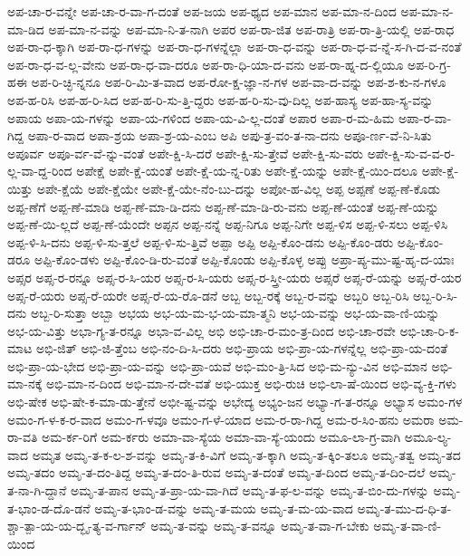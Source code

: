 {ಅಪ-ಚಾ-ರ-ವನ್ನೇ
ಅಪ-ಚಾ-ರ-ವಾ-ಗ-ದಂತೆ
ಅಪ-ಜಯ
ಅಪ-ಥ್ಯದ
ಅಪ-ಮಾನ
ಅಪ-ಮಾ-ನ-ದಿಂದ
ಅಪ-ಮಾ-ನ-ಮಾ-ಡಿದ
ಅಪ-ಮಾ-ನ-ವನ್ನು
ಅಪ-ಮಾ-ನಿ-ತ-ನಾಗಿ
ಅಪರ
ಅಪ-ರಾ-ಜಿತ
ಅಪ-ರಾತ್ರಿ
ಅಪ-ರಾ-ತ್ರಿ-ಯಲ್ಲಿ
ಅಪ-ರಾಧ
ಅಪ-ರಾ-ಧ-ಕ್ಕಾಗಿ
ಅಪ-ರಾ-ಧ-ಗಳನ್ನು
ಅಪ-ರಾ-ಧ-ಗಳನ್ನೆಲ್ಲಾ
ಅಪ-ರಾ-ಧ-ವನ್ನು
ಅಪ-ರಾ-ಧ-ವ-ನ್ನೆ-ಸ-ಗಿ-ದ-ವ-ನಂತೆ
ಅಪ-ರಾ-ಧ-ವ-ಲ್ಲ-ವೇನು
ಅಪ-ರಾ-ಧ-ವಾ-ದರೂ
ಅಪ-ರಾ-ಧಿ-ಯಾ-ದ-ವನು
ಅಪ-ರಾ-ಹ್ನ-ದ-ಲ್ಲಿಯೂ
ಅಪ-ರಿ-ಗ್ರ-ಹಈ
ಅಪ-ರಿ-ಚ್ಛಿ-ನ್ನನೂ
ಅಪ-ರಿ-ಮಿ-ತ-ವಾದ
ಅಪ-ರೋ-ಕ್ಷ-ಜ್ಞಾ-ನ-ಗಳ
ಅಪ-ವಾ-ದ-ವನ್ನು
ಅಪ-ಶ-ಕು-ನ-ಗಳೂ
ಅಪ-ಹ-ರಿಸಿ
ಅಪ-ಹ-ರಿ-ಸಿದ
ಅಪ-ಹ-ರಿ-ಸು-ತ್ತಿ-ದ್ದರು
ಅಪ-ಹ-ರಿ-ಸು-ವು-ದಿಲ್ಲ
ಅಪ-ಹಾಸ್ಯ
ಅಪ-ಹಾ-ಸ್ಯ-ವನ್ನು
ಅಪಾಯ
ಅಪಾ-ಯ-ಗಳನ್ನು
ಅಪಾ-ಯ-ಗಳಿಂದ
ಅಪಾ-ಯ-ವಿ-ಲ್ಲ-ದಂತೆ
ಅಪಾರ
ಅಪಾ-ರ-ಮ-ಹಿಮ
ಅಪಾ-ರ-ವಾ-ಗಿದ್ದ
ಅಪಾ-ರ-ವಾದ
ಅಪಾ-ಶ್ರಯ
ಅಪಾ-ಶ್ರ-ಯ-ಎಂಬ
ಅಪಿ
ಅಪು-ತ್ರ-ವಂ-ತ-ನಾ-ದನು
ಅಪೂ-ರ್ಣ-ವೆ-ನಿ-ಸಿತು
ಅಪೂರ್ವ
ಅಪೂ-ರ್ವ-ವೆ-ನ್ನು-ವಂತೆ
ಅಪೇ-ಕ್ಷಿ-ಸಿ-ದರೆ
ಅಪೇ-ಕ್ಷಿ-ಸು-ತ್ತೇವೆ
ಅಪೇ-ಕ್ಷಿ-ಸು-ವರು
ಅಪೇ-ಕ್ಷಿ-ಸು-ವ-ವ-ರ-ಲ್ಲ-ವಾ-ದ್ದ-ರಿಂದ
ಅಪೇಕ್ಷೆ
ಅಪೇ-ಕ್ಷೆ-ಯಂತೆ
ಅಪೇ-ಕ್ಷೆ-ಯ-ನ್ನ-ರಿತು
ಅಪೇ-ಕ್ಷೆ-ಯನ್ನು
ಅಪೇ-ಕ್ಷೆ-ಯಿಂ-ದಲೂ
ಅಪೇ-ಕ್ಷೆ-ಯಿತ್ತು
ಅಪೇ-ಕ್ಷೆಯೆ
ಅಪೇ-ಕ್ಷೆಯೇ
ಅಪೇ-ಕ್ಷೆ-ಯೇ-ನೆಂ-ಬು-ದನ್ನು
ಅಪೋ-ಹ-ವಿಲ್ಲ
ಅಪ್ಪ
ಅಪ್ಪಣೆ
ಅಪ್ಪ-ಣೆ-ಕೊಡು
ಅಪ್ಪ-ಣೆಗೆ
ಅಪ್ಪ-ಣೆ-ಮಾಡಿ
ಅಪ್ಪ-ಣೆ-ಮಾ-ಡಿ-ದನು
ಅಪ್ಪ-ಣೆ-ಮಾ-ಡಿ-ರು-ವನು
ಅಪ್ಪ-ಣೆ-ಯಂತೆ
ಅಪ್ಪ-ಣೆ-ಯನ್ನು
ಅಪ್ಪ-ಣೆ-ಯಿ-ಲ್ಲದೆ
ಅಪ್ಪ-ಣೆ-ಯೆಂದೇ
ಅಪ್ಪನ
ಅಪ್ಪ-ನನ್ನೆ
ಅಪ್ಪ-ನಿಗೂ
ಅಪ್ಪ-ನಿಗೇ
ಅಪ್ಪ-ಳಿಸ
ಅಪ್ಪ-ಳಿ-ಸಲು
ಅಪ್ಪ-ಳಿಸಿ
ಅಪ್ಪ-ಳಿ-ಸಿ-ದನು
ಅಪ್ಪ-ಳಿ-ಸು-ತ್ತಲೆ
ಅಪ್ಪ-ಳಿ-ಸು-ತ್ತಿವೆ
ಅಪ್ಪಾ
ಅಪ್ಪಿ
ಅಪ್ಪಿ-ಕೊಂ-ಡನು
ಅಪ್ಪಿ-ಕೊಂ-ಡರು
ಅಪ್ಪಿ-ಕೊಂ-ಡರೂ
ಅಪ್ಪಿ-ಕೊಂ-ಡಳು
ಅಪ್ಪಿ-ಕೊಂ-ಡಿ-ರು-ವಂತೆ
ಅಪ್ಪಿ-ಕೊಂಡು
ಅಪ್ಪಿ-ಕೊಳ್ಳ
ಅಪ್ಪು
ಅಪ್ರಾ-ಪ್ಯ-ಮು-ಷ್ಟ-ಹೃ-ದ-ಯಾಃ
ಅಪ್ಸರ
ಅಪ್ಸ-ರ-ರನ್ನೂ
ಅಪ್ಸ-ರ-ಸಿ-ಯರ
ಅಪ್ಸ-ರ-ಸಿ-ಯರು
ಅಪ್ಸ-ರ-ಸ್ತ್ರೀ-ಯರು
ಅಪ್ಸರೆ
ಅಪ್ಸ-ರೆ-ಯನ್ನು
ಅಪ್ಸ-ರೆ-ಯರ
ಅಪ್ಸ-ರೆ-ಯರು
ಅಪ್ಸ-ರೆ-ಯರೇ
ಅಪ್ಸ-ರೆ-ಯ-ರೊ-ಡನೆ
ಅಬ್ಬ
ಅಬ್ಬ-ರಕ್ಕೆ
ಅಬ್ಬ-ರ-ವನ್ನು
ಅಬ್ಬರಿ
ಅಬ್ಬ-ರಿಸಿ
ಅಬ್ಬ-ರಿ-ಸಿ-ದನು
ಅಬ್ಬ-ರಿ-ಸುತ್ತಾ
ಅಬ್ಬಾ
ಅಭಯ
ಅಭ-ಯ-ಮ-ಭ-ಯ-ಮಾ-ತ್ಮನಿ
ಅಭ-ಯ-ವನ್ನು
ಅಭ-ಯ-ವಾ-ಣಿ-ಯನ್ನು
ಅಭ-ಯ-ವಿತ್ತು
ಅಭಾ-ಗ್ಯ-ತ-ರನ್ನೂ
ಅಭಾ-ವ-ವಿಲ್ಲ
ಅಭಿ
ಅಭಿ-ಚಾ-ರ-ಮಂ-ತ್ರ-ದಿಂದ
ಅಭಿ-ಚಾ-ರವೇ
ಅಭಿ-ಚಾ-ರಿ-ಕ-ಮಾಟ
ಅಭಿ-ಜಿತ್
ಅಭಿ-ಜಿ-ತ್ತೆಂಬ
ಅಭಿ-ನಂ-ದಿ-ಸಿ-ದರು
ಅಭಿ-ಪ್ರಾಯ
ಅಭಿ-ಪ್ರಾ-ಯ-ಗಳನ್ನೆಲ್ಲ
ಅಭಿ-ಪ್ರಾ-ಯ-ದಂತೆ
ಅಭಿ-ಪ್ರಾ-ಯ-ಭೇದ
ಅಭಿ-ಪ್ರಾ-ಯ-ವನ್ನು
ಅಭಿ-ಪ್ರಾ-ಯವೆ
ಅಭಿ-ಮಂ-ತ್ರಿ-ಸಿದ
ಅಭಿ-ಮ-ನ್ಯು-ವಿನ
ಅಭಿ-ಮಾನ
ಅಭಿ-ಮಾ-ನಕ್ಕೆ
ಅಭಿ-ಮಾ-ನ-ದಿಂದ
ಅಭಿ-ಮಾ-ನ-ದೇ-ವತೆ
ಅಭಿ-ಯುಕ್ತ
ಅಭಿ-ರುಚಿ
ಅಭಿ-ಲಾ-ಷೆ-ಯಿಂದ
ಅಭಿ-ವ್ಯ-ಕ್ತಿ-ಗಳು
ಅಭಿ-ಷೇಕ
ಅಭಿ-ಷೇ-ಕ-ಮಾ-ಡು-ತ್ತೇನೆ
ಅಭೀ-ಷ್ಟ-ವನ್ನು
ಅಭೇದ್ಯ
ಅಭ್ಯಂ-ಜನ
ಅಭ್ಯಾ-ಗ-ತ-ರನ್ನೂ
ಅಭ್ಯಾಸ
ಅಮಂ-ಗಳ
ಅಮಂ-ಗ-ಳ-ಕ-ರ-ವಾದ
ಅಮಂ-ಗ-ಳವೂ
ಅಮಂ-ಗ-ಳೆ-ಯಾದ
ಅಮ-ರ-ರಾ-ಗಿದ್ದ
ಅಮ-ರ-ಸಿಂ-ಹನು
ಅಮರಾ
ಅಮ-ರಾ-ವತಿ
ಅಮ-ರ್ಕ-ರಿಗೆ
ಅಮ-ರ್ಕರು
ಅಮಾ-ವಾ-ಸ್ಯೆಯ
ಅಮಾ-ವಾ-ಸ್ಯೆ-ಯಂದು
ಅಮೂ-ಲಾ-ಗ್ರ-ವಾಗಿ
ಅಮೂ-ಲ್ಯ-ವಾದ
ಅಮೃತ
ಅಮೃ-ತ-ಕ-ಲ-ಶ-ವನ್ನು
ಅಮೃ-ತ-ಕಿ-ವಿಗೆ
ಅಮೃ-ತ-ಕ್ಕಾಗಿ
ಅಮೃ-ತ-ಕ್ಕಿಂ-ತಲೂ
ಅಮೃ-ತತ್ವ
ಅಮೃ-ತದ
ಅಮೃ-ತದಂ
ಅಮೃ-ತ-ದಂ-ತಿದ್ದ
ಅಮೃ-ತ-ದಂ-ತಿ-ರುವ
ಅಮೃ-ತ-ದಂತೆ
ಅಮೃ-ತ-ದಿಂದ
ಅಮೃ-ತ-ದಿಂ-ದಲೆ
ಅಮೃ-ತ-ನಾ-ಗಿ-ದ್ದಾನೆ
ಅಮೃ-ತ-ಪಾನ
ಅಮೃ-ತ-ಪ್ರಾ-ಯ-ವಾ-ಗಿದೆ
ಅಮೃ-ತ-ಫ-ಲ-ವನ್ನು
ಅಮೃ-ತ-ಬಿಂ-ದು-ಗಳನ್ನು
ಅಮೃ-ತ-ಭಾಂ-ಡ-ದೊ-ಡನೆ
ಅಮೃ-ತ-ಭಾಂ-ಡ-ವನ್ನು
ಅಮೃ-ತ-ಮಯ
ಅಮೃ-ತ-ಮ-ಯ-ವಾದ
ಅಮೃ-ತ-ಮು-ದ-ಧಿ-ತ-ಶ್ಚಾ-ತ್ಪಾ-ಯ-ಯ-ದ್ಭೃ-ತ್ಯ-ವ-ರ್ಗಾನ್
ಅಮೃ-ತ-ವನ್ನು
ಅಮೃ-ತ-ವನ್ನೂ
ಅಮೃ-ತ-ವಾ-ಗ-ಬೇಕು
ಅಮೃ-ತ-ವಾ-ಣಿ-ಯಿಂದ
}
